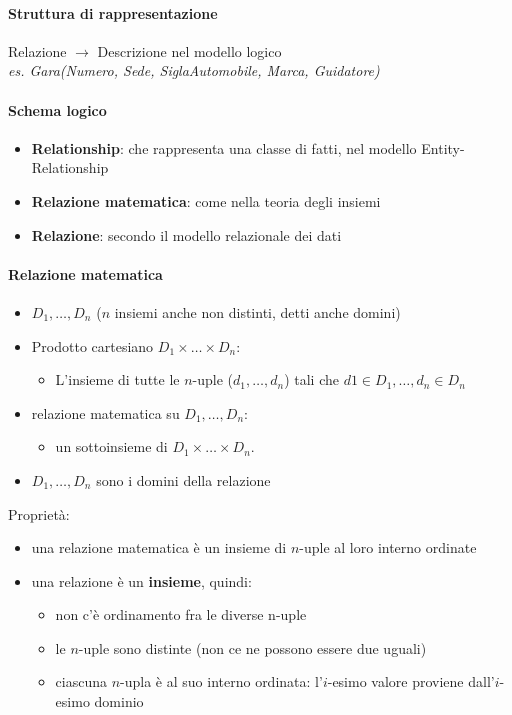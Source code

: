 \documentclass[12pt]{article}
\begin{document}
    \paragraph{Struttura di rappresentazione}
    Relazione $\rightarrow$ Descrizione nel modello logico \\\textit{es. Gara(Numero, Sede, SiglaAutomobile, Marca, Guidatore)}
    \paragraph{Schema logico}
    \begin{itemize}
        \item \textbf{Relationship}: che rappresenta una classe di fatti, nel modello Entity-Relationship
        \item \textbf{Relazione matematica}: come nella teoria degli insiemi
        \item \textbf{Relazione}: secondo il modello relazionale dei dati
    \end{itemize}

    \paragraph{Relazione matematica}
    \begin{itemize}
        \item $D_1, \dots, D_n$ ($n$  insiemi anche non distinti, detti anche domini) 
        \item Prodotto cartesiano $D_1 \times \dots \times D_n$: 
            \begin{itemize}
                \item L’insieme di tutte le  $n$-uple ($d_1, \dots, d_n$) tali che $d1 \in D_1, \dots, d_n \in D_n $
            \end{itemize}
        \item relazione matematica su $D_1, \dots, D_n$:
            \begin{itemize}
                \item un sottoinsieme di $D_1 \times \dots \times D_n$.
            \end{itemize}
        \item $D_1, \dots, D_n$ sono i domini della relazione 
    \end{itemize}
    Proprietà:
    \begin{itemize}
        \item una relazione matematica è un insieme di  $n$-uple al loro interno ordinate
        \item una relazione è un \textbf{insieme}, quindi:
        \begin{itemize}
            \item non c'è ordinamento fra le diverse n-uple
            \item le $n$-uple sono distinte (non ce ne possono essere due uguali) 
            \item ciascuna $n$-upla è al suo interno ordinata: l’$i$-esimo valore proviene dall’$i$-esimo dominio
        \end{itemize}
    \end{itemize}
\end{document}
